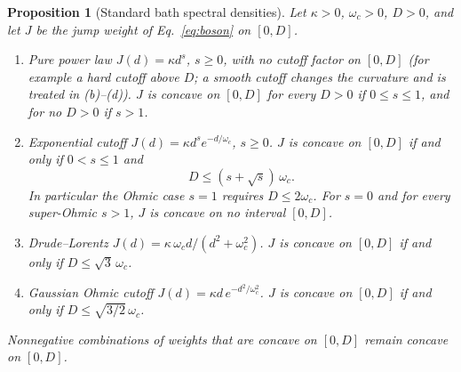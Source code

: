 \documentclass[11pt,a4paper]{article}
\newtheorem{proposition}[theorem]{Proposition}
\theoremstyle{remark}\newtheorem{remark}[theorem]{Remark}
\begin{document}
\begin{proposition}[Standard bath spectral densities]\label{prop:baths}
Let $\kappa>0$, $\omega_c>0$, $D>0$, and let $J$ be the jump weight of Eq.~\eqref{eq:boson} on $[0,D]$.
\begin{enumerate}[label=(\alph*)]
\item \emph{Pure power law} $J(d)=\kappa d^s$, $s\ge0$, with no cutoff factor on $[0,D]$ (for example a hard cutoff above $D$; a smooth cutoff changes the curvature and is treated in (b)--(d)). $J$ is concave on $[0,D]$ for every $D>0$ if $0\le s\le1$, and for no $D>0$ if $s>1$.
\item \emph{Exponential cutoff} $J(d)=\kappa d^se^{-d/\omega_c}$, $s\ge0$. $J$ is concave on $[0,D]$ if and only if $0<s\le1$ and
\begin{equation}
 D\le(s+\sqrt s)\,\omega_c .
 \label{eq:expthreshold}
\end{equation}
In particular the Ohmic case $s=1$ requires $D\le2\omega_c$. For $s=0$ and for every super-Ohmic $s>1$, $J$ is concave on no interval $[0,D]$.
\item \emph{Drude--Lorentz} $J(d)=\kappa\,\omega_c d/(d^2+\omega_c^2)$. $J$ is concave on $[0,D]$ if and only if $D\le\sqrt3\,\omega_c$.
\item \emph{Gaussian Ohmic cutoff} $J(d)=\kappa d\,e^{-d^2/\omega_c^2}$. $J$ is concave on $[0,D]$ if and only if $D\le\sqrt{3/2}\,\omega_c$.
\end{enumerate}
Nonnegative combinations of weights that are concave on $[0,D]$ remain concave on $[0,D]$.
\end{proposition}
\end{document}
